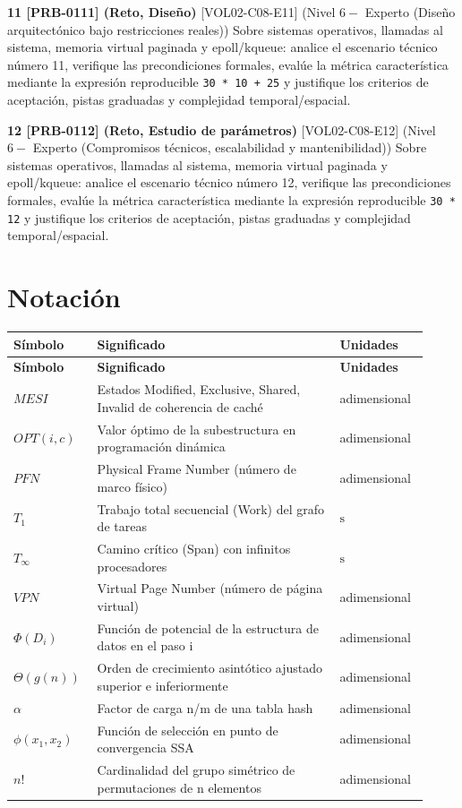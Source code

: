 \documentclass{book}
\begin{document}
\begin{tcolorbox}[title={Ejercicios}, studiumworked, breakable]
\noindent\textbf{11 [PRB-0111] (Reto, Diseño)}
[VOL02-C08-E11] (Nivel \(6 -\) Experto (Diseño arquitectónico bajo restricciones reales)) Sobre sistemas operativos, llamadas al sistema, memoria virtual paginada y epoll/kqueue: analice el escenario técnico número 11, verifique las precondiciones formales, evalúe la métrica característica mediante la expresión reproducible \texttt{30 * 10 + 25} y justifique los criterios de aceptación, pistas graduadas y complejidad temporal/espacial.

\noindent\textbf{12 [PRB-0112] (Reto, Estudio de parámetros)}
[VOL02-C08-E12] (Nivel \(6 -\) Experto (Compromisos técnicos, escalabilidad y mantenibilidad)) Sobre sistemas operativos, llamadas al sistema, memoria virtual paginada y epoll/kqueue: analice el escenario técnico número 12, verifique las precondiciones formales, evalúe la métrica característica mediante la expresión reproducible \texttt{30 * 12} y justifique los criterios de aceptación, pistas graduadas y complejidad temporal/espacial.
\end{tcolorbox}
\appendix
\chapter{Notación}

\begingroup
\setlength{\LTpre}{0pt}
\setlength{\LTpost}{0pt}
\begin{longtable}{@{}>{\centering\arraybackslash}p{0.17\linewidth}>{\raggedright\arraybackslash}p{0.55\linewidth}>{\raggedright\arraybackslash}p{0.2\linewidth}@{}}
\textbf{Símbolo} & \textbf{Significado} & \textbf{Unidades} \\
\hline
\endfirsthead
\textbf{Símbolo} & \textbf{Significado} & \textbf{Unidades} \\
\hline
\endhead
$MESI$ & Estados Modified, Exclusive, Shared, Invalid de coherencia de caché & adimensional \\
$OPT(i, c)$ & Valor óptimo de la subestructura en programación dinámica & adimensional \\
$PFN$ & Physical Frame Number (número de marco físico) & adimensional \\
$T_{1}$ & Trabajo total secuencial (Work) del grafo de tareas & $\mathrm{s}$ \\
$T_\infty$ & Camino crítico (Span) con infinitos procesadores & $\mathrm{s}$ \\
$VPN$ & Virtual Page Number (número de página virtual) & adimensional \\
$\Phi(D_i)$ & Función de potencial de la estructura de datos en el paso i & adimensional \\
$\Theta(g(n))$ & Orden de crecimiento asintótico ajustado superior e inferiormente & adimensional \\
$\alpha$ & Factor de carga n/m de una tabla hash & adimensional \\
$\phi(x_1, x_2)$ & Función de selección en punto de convergencia SSA & adimensional \\
$n!$ & Cardinalidad del grupo simétrico de permutaciones de n elementos & adimensional \\
\end{longtable}
\endgroup
\end{document}
